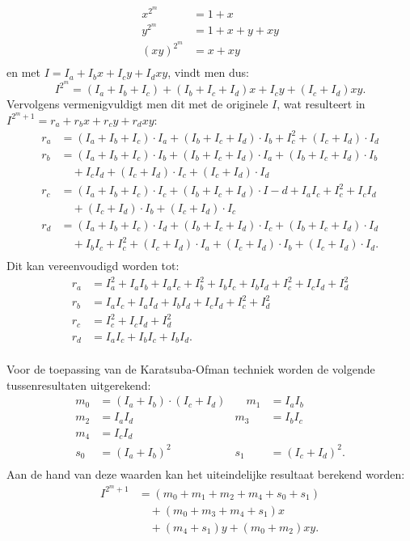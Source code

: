 \[\begin{aligned}
x^{2^m}	&= 1 + x\\
y^{2^m}	&= 1 + x + y + xy\\
(xy)^{2^m}	&= x + xy\\
\end{aligned}\]
en met $I = I_a + I_b x + I_c y + I_d xy$, vindt men dus:
\[I^{2^m} = (I_a + I_b + I_c) + (I_b + I_c + I_d) x + I_c y + (I_c + I_d) xy.\]
Vervolgens vermenigvuldigt men dit met de originele $I$, wat resulteert in $I^{2^m + 1} = r_a + r_b x + r_c y + r_d xy$:
\[\begin{aligned}
r_a	&= (I_a + I_b + I_c) \cdot I_a + (I_b + I_c + I_d) \cdot I_b + I_c^2 + (I_c + I_d) \cdot I_d\\
r_b	&= (I_a + I_b + I_c) \cdot I_b + (I_b + I_c + I_d) \cdot I_a + (I_b + I_c + I_d) \cdot I_b\\
		&\quad + I_c I_d + (I_c + I_d) \cdot I_c + (I_c + I_d) \cdot I_d\\
r_c	&= (I_a + I_b + I_c) \cdot I_c + (I_b + I_c + I_d) \cdot I-d + I_a I_c + I_c^2 + I_c I_d\\
		&\quad + (I_c + I_d) \cdot I_b + (I_c + I_d) \cdot I_c\\
r_d	&= (I_a + I_b + I_c) \cdot I_d + (I_b + I_c + I_d) \cdot I_c + (I_b + I_c + I_d) \cdot I_d\\
		&\quad + I_b I_c + I_c^2 + (I_c + I_d) \cdot I_a + (I_c + I_d) \cdot I_b + (I_c + I_d) \cdot I_d.\\
\end{aligned}\]
Dit kan vereenvoudigd worden tot:
\[\begin{aligned}
r_a	&= I_a^2 + I_a I_b + I_a I_c + I_b^2 + I_b I_c + I_b I_d + I_c^2 + I_c I_d + I_d^2\\
r_b	&= I_a I_c + I_a I_d + I_b I_d + I_c I_d + I_c^2 + I_d^2\\
r_c	&= I_c^2 + I_c I_d + I_d^2\\
r_d	&= I_a I_c + I_b I_c + I_b I_d.\\
\end{aligned}\]

Voor de toepassing van de Karatsuba-Ofman techniek worden de volgende tussenresultaten uitgerekend:
\[\begin{aligned}
m_0	&= (I_a + I_b) \cdot (I_c + I_d)
			&\quad m_1	&= I_a I_b\\
m_2	&= I_a I_d
			&m_3	&= I_b I_c\\
m_4	&= I_c I_d\\
s_0	&= (I_a + I_b)^2
			&s_1	&= (I_c + I_d)^2.\\
\end{aligned}\]
Aan de hand van deze waarden kan het uiteindelijke resultaat berekend worden:
\[\begin{aligned}
I^{2^m + 1}	&= (m_0 + m_1 + m_2 + m_4 + s_0 + s_1)\\
				&\quad + (m_0 + m_3 + m_4 + s_1) x \\
				&\quad + (m_4 + s_1) y + (m_0 + m_2) xy.\\
\end{aligned}\]

